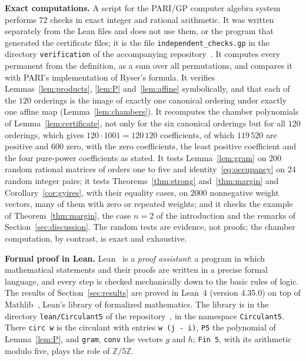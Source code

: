 \documentclass[11pt,a4paper]{article}
\theoremstyle{definition}
\theoremstyle{remark}
\newcommand{\Z}{\mathbb{Z}}
\newcommand{\para}[1]{\par\medskip\noindent\textbf{#1}\enspace}
\begin{document}
\para{Exact computations.}
A script for the PARI/GP computer algebra system performs $72$ checks in exact integer and rational arithmetic. It was
written separately from the Lean files and does not use them, or the program that generated the certificate files; it is the file \texttt{independent\_checks.gp} in the directory
\texttt{verification} of the accompanying repository~\cite{repo}. It computes every permanent from the definition, as a
sum over all permutations, and compares it with PARI's implementation of Ryser's formula. It verifies
Lemmas~\ref{lem:products}, \ref{lem:P} and~\ref{lem:affine} symbolically, and that each of the $120$ orderings is the image of exactly one canonical ordering
under exactly one affine map (Lemma~\ref{lem:chambers}). It recomputes the chamber polynomials of
Lemma~\ref{lem:certificate}, not only for the six canonical orderings but for all $120$ orderings, which gives
$120\cdot1001=120\,120$ coefficients, of which $119\,520$ are positive and $600$ zero, with the zero coefficients, the
least positive coefficient and the four pure-power coefficients as stated. It tests Lemma~\ref{lem:gram} on $200$ random
rational matrices of orders one to five and identity~\eqref{eq:occupancy} on $24$ random integer pairs; it tests
Theorems~\ref{thm:strong} and~\ref{thm:margin} and Corollary~\ref{cor:gyires}, with their equality cases, on
$2000$ nonnegative weight vectors, many of them with zero or repeated weights; and it checks the example of
Theorem~\ref{thm:margin}, the case $n=2$ of the introduction and the remarks of Section~\ref{sec:discussion}. The
random tests are evidence, not proofs; the chamber computation, by contrast, is exact and exhaustive.

\para{Formal proof in Lean.}
Lean~\cite{lean} is a \emph{proof assistant}: a program in which mathematical statements and their proofs are written
in a precise formal language, and every step is checked mechanically down to the basic rules of logic. The results of
Section~\ref{sec:results} are proved in Lean~4 (version 4.35.0) on top of Mathlib~\cite{mathlib}, Lean's library of
formalized mathematics. The library is in the directory \texttt{lean/Circulant5} of the repository~\cite{repo}, in the
namespace \texttt{Circulant5}. There \texttt{circ w} is the circulant with entries \texttt{w (j - i)}, \texttt{P5} the
polynomial of Lemma~\ref{lem:P}, and \texttt{gram}, \texttt{conv} the vectors $g$ and $h$; \texttt{Fin 5}, with its
arithmetic modulo five, plays the role of $\Z/5\Z$.
\end{document}
